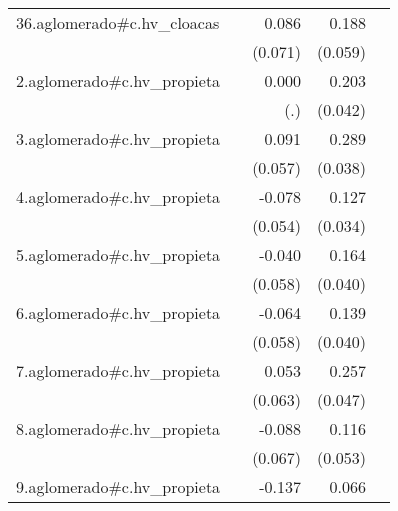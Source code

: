 {\begin{longtable}{l*{4}{D{.}{.}{-1}}}
\addlinespace
36.aglomerado#c.hv\_cloacas&                     &       0.086         &       0.188\sym{**} &                     \\
            &                     &     (0.071)         &     (0.059)         &                     \\
\addlinespace
2.aglomerado#c.hv\_propieta&                     &       0.000         &       0.203\sym{***}&                     \\
            &                     &         (.)         &     (0.042)         &                     \\
\addlinespace
3.aglomerado#c.hv\_propieta&                     &       0.091         &       0.289\sym{***}&                     \\
            &                     &     (0.057)         &     (0.038)         &                     \\
\addlinespace
4.aglomerado#c.hv\_propieta&                     &      -0.078         &       0.127\sym{***}&                     \\
            &                     &     (0.054)         &     (0.034)         &                     \\
\addlinespace
5.aglomerado#c.hv\_propieta&                     &      -0.040         &       0.164\sym{***}&                     \\
            &                     &     (0.058)         &     (0.040)         &                     \\
\addlinespace
6.aglomerado#c.hv\_propieta&                     &      -0.064         &       0.139\sym{***}&                     \\
            &                     &     (0.058)         &     (0.040)         &                     \\
\addlinespace
7.aglomerado#c.hv\_propieta&                     &       0.053         &       0.257\sym{***}&                     \\
            &                     &     (0.063)         &     (0.047)         &                     \\
\addlinespace
8.aglomerado#c.hv\_propieta&                     &      -0.088         &       0.116\sym{*}  &                     \\
            &                     &     (0.067)         &     (0.053)         &                     \\
\addlinespace
9.aglomerado#c.hv\_propieta&                     &      -0.137\sym{*}  &       0.066         &                     \\

\end{longtable}}
